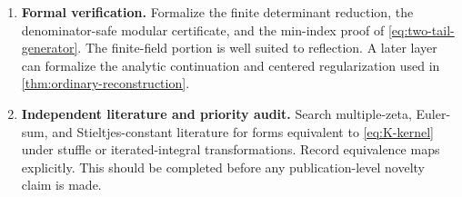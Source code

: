 \begin{enumerate}[label=\textbf{R\arabic*.},leftmargin=*]
\item \textbf{Formal verification.}
Formalize the finite determinant reduction, the denominator-safe modular
certificate, and the min-index proof of
\eqref{eq:two-tail-generator}.  The finite-field portion is well suited
to reflection.  A later layer can formalize the analytic continuation
and centered regularization used in
\cref{thm:ordinary-reconstruction}.

\item \textbf{Independent literature and priority audit.}
Search multiple-zeta, Euler-sum, and Stieltjes-constant literature for
forms equivalent to \eqref{eq:K-kernel} under stuffle or iterated-integral
transformations.  Record equivalence maps explicitly.  This should be
completed before any publication-level novelty claim is made.
\end{enumerate}
